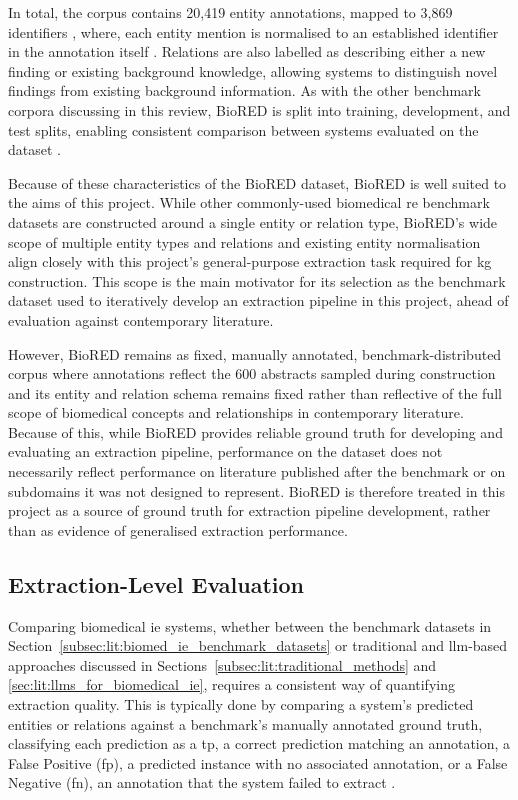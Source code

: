 In total, the corpus contains 20,419 entity annotations, mapped to 3,869 identifiers \ck, where, each entity mention is normalised to an established identifier in the annotation itself \cite{luo2022_biored}. Relations are also labelled as describing either a new finding or existing background knowledge, allowing systems to distinguish novel findings from existing background information. As with the other benchmark corpora discussing in this review, BioRED is split into training, development, and test splits, enabling consistent comparison between systems evaluated on the dataset \cite{luo2022_biored}.

Because of these characteristics of the BioRED dataset, BioRED is well suited to the aims of this project. While other commonly-used biomedical \gls{re} benchmark datasets are constructed around a single entity or relation type, BioRED's wide scope of multiple entity types and relations and existing entity normalisation align closely with this project's general-purpose extraction task required for \gls{kg} construction. This scope is the main motivator for its selection as the benchmark dataset used to iteratively develop an extraction pipeline in this project, ahead of evaluation against contemporary literature.

However, BioRED remains as fixed, manually annotated, benchmark-distributed corpus where annotations reflect the 600 abstracts sampled during construction and its entity and relation schema remains fixed rather than reflective of the full scope of biomedical concepts and relationships in contemporary literature. Because of this, while BioRED provides reliable ground truth for developing and evaluating an extraction pipeline, performance on the dataset does not necessarily reflect performance on literature published after the benchmark or on subdomains it was not designed to represent. BioRED is therefore treated in this project as a source of ground truth for extraction pipeline development, rather than as evidence of generalised extraction performance.

\subsection{Extraction-Level Evaluation}
\label{subsec:lit:extraction_level_eval}
Comparing biomedical \gls{ie} systems, whether between the benchmark datasets in Section~\ref{subsec:lit:biomed_ie_benchmark_datasets} or traditional and \gls{llm}-based approaches discussed in Sections~\ref{subsec:lit:traditional_methods} and \ref{sec:lit:llms_for_biomedical_ie}, requires a consistent way of quantifying extraction quality. This is typically done by comparing a system's predicted entities or relations against a benchmark's manually annotated ground truth, classifying each prediction as a \gls{tp}, a correct prediction matching an annotation, a False Positive (\gls{fp}), a predicted instance with no associated annotation, or a False Negative (\gls{fn}), an annotation that the system failed to extract \pref.

